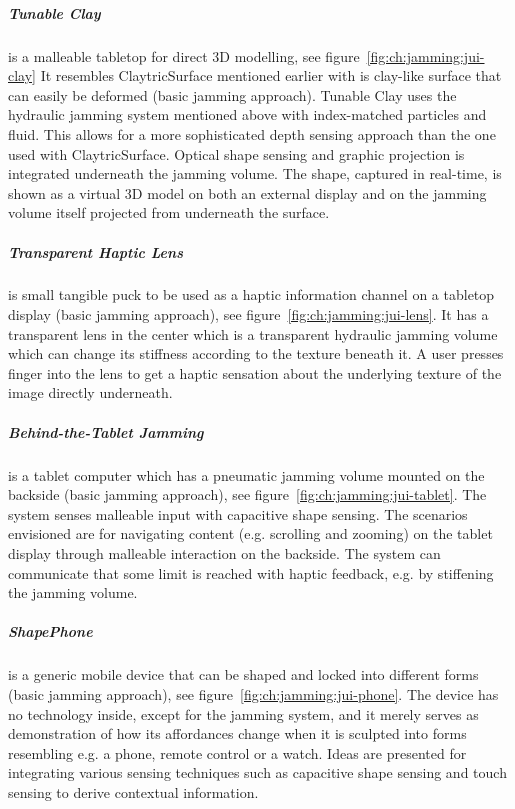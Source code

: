 \subparagraph{Tunable Clay} is a malleable tabletop for direct 3D modelling, see figure~\ref{fig:ch:jamming:jui-clay}
It resembles ClaytricSurface \citep{matoba2012claytricsurface} mentioned earlier with is clay-like surface that can easily be deformed (basic jamming approach).
Tunable Clay uses the hydraulic jamming system mentioned above with index-matched particles and fluid.
This allows for a more sophisticated depth sensing approach than the one used with ClaytricSurface.
Optical shape sensing and graphic projection is integrated underneath the jamming volume.
The shape, captured in real-time, is shown as a virtual 3D model on both an external display and on the jamming volume itself projected from underneath the surface.

\subparagraph{Transparent Haptic Lens} is small tangible puck to be used as a haptic information channel on a tabletop display (basic jamming approach), see figure~\ref{fig:ch:jamming:jui-lens}.
It has a transparent lens in the center which is a transparent hydraulic jamming volume which can change its stiffness according to the texture beneath it.
A user presses  finger into the lens to get a haptic sensation about the underlying texture of the image directly underneath. 

\subparagraph{Behind-the-Tablet Jamming} is a tablet computer which has a pneumatic jamming volume mounted on the backside (basic jamming approach), see figure~\ref{fig:ch:jamming:jui-tablet}.
The system senses malleable input with capacitive shape sensing.
The scenarios envisioned are for navigating content (e.g. scrolling and zooming) on the tablet display through malleable interaction on the backside. 
The system can communicate that some limit is reached with haptic feedback, 
e.g. by stiffening the jamming volume.

\subparagraph{ShapePhone} is a generic mobile device that can be shaped and locked into different forms (basic jamming approach), see figure~\ref{fig:ch:jamming:jui-phone}.
The device has no technology inside, except for the jamming system, and it merely serves as demonstration of how its affordances change when it is sculpted into forms resembling e.g. a phone, remote control or a watch.
Ideas are presented for integrating various sensing techniques such as capacitive shape sensing and touch sensing to derive contextual information.

